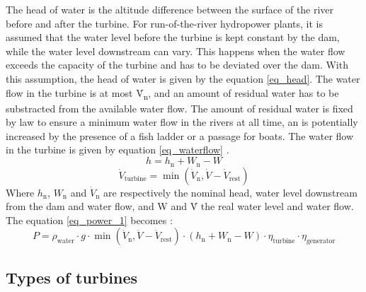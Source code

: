 The head of water is the altitude difference between the surface of the river before and after the turbine. For run-of-the-river hydropower plants, it is assumed that the water level before the turbine is kept constant by the dam, while the water level downstream can vary. This happens when the water flow exceeds the capacity of the turbine and has to be deviated over the dam. With this assumption, the head of water is given by the equation \ref{eq_head}. The water flow in the turbine is at most \.{V}\textsubscript{n}, and an amount of residual water has to be substracted from the available water flow. The amount of residual water is fixed by law to ensure a minimum water flow in the rivers at all time, an is potentially increased by the presence of a fish ladder or a passage for boats. The water flow in the turbine is given by equation \ref{eq_waterflow} \cite{quaschning}.
\begin{equation}
\label{eq_head} 
 h = h_\mathrm{n} +W_\mathrm{n}-W
\end{equation}
\begin{equation}
\label{eq_waterflow} 
 \dot{V}_\mathrm{turbine} = \min(\dot{V}_\mathrm{n},\dot{V}-\dot{V}_\mathrm{rest})
\end{equation}
Where $h_\mathrm{n}$, $W_\mathrm{n}$ and $\dot{V}_\mathrm{n}$ are respectively the nominal head, water level downstream from the dam and water flow, and W and \.{V} the real water level and water flow.
\newline
The  equation \ref{eq_power_1} becomes :
\begin{equation}
 \label{eq_power_2} 
 P = \rho_\mathrm{water} \cdot g \cdot \min(\dot{V}_\mathrm{n},\dot{V}-\dot{V}_\mathrm{rest}) \cdot (h_\mathrm{n} +W_\mathrm{n}-W) \cdot \eta_\mathrm{turbine} \cdot \eta_\mathrm{generator}
\end{equation}

\subsection{Types of turbines}

